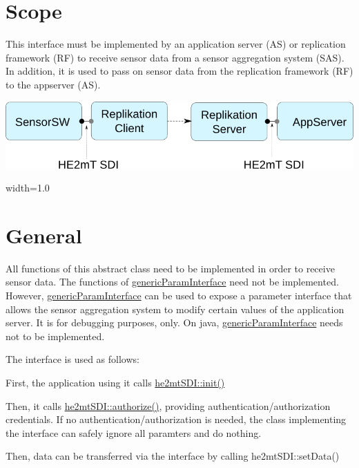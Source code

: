 \hypertarget{index_secScope}{}\section{Scope}\label{index_secScope}
This interface must be implemented by an application server (A\-S) or replication framework (R\-F) to receive sensor data from a sensor aggregation system (S\-A\-S). In addition, it is used to pass on sensor data from the replication framework (R\-F) to the appserver (A\-S).  
\begin{DoxyImage}
\includegraphics{interfaces.png}
\caption{width=1.0}
\end{DoxyImage}
\hypertarget{index_secGeneral}{}\section{General}\label{index_secGeneral}
All functions of this abstract class need to be implemented in order to receive sensor data. The functions of \hyperlink{classgeneric_param_interface}{generic\-Param\-Interface} need not be implemented. However, \hyperlink{classgeneric_param_interface}{generic\-Param\-Interface} can be used to expose a parameter interface that allows the sensor aggregation system to modify certain values of the application server. It is for debugging purposes, only. On java, \hyperlink{classgeneric_param_interface}{generic\-Param\-Interface} needs not to be implemented.

The interface is used as follows\-:
\begin{DoxyItemize}
\item First, the application using it calls \hyperlink{classhe2mt_s_d_i_a6a3b5da850e0571bc4a8c8e0de7ad9e8}{he2mt\-S\-D\-I\-::init()}
\item Then, it calls \hyperlink{classhe2mt_s_d_i_ae5212f96e535b795b11fd34a89a3d616}{he2mt\-S\-D\-I\-::authorize()}, providing authentication/authorization credentials. If no authentication/authorization is needed, the class implementing the interface can safely ignore all paramters and do nothing.\par

\item Then, data can be transferred via the interface by calling he2mt\-S\-D\-I\-::set\-Data()
\end{DoxyItemize}

